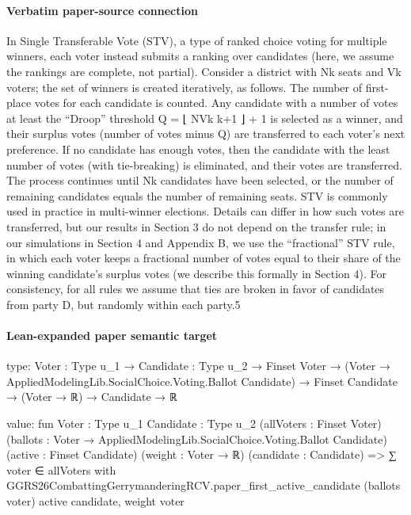 \documentclass[10pt]{article}
\begin{document}
\paragraph{Verbatim paper-source connection}
\begin{ReviewVerbatim}
In Single Transferable Vote (STV), a type of ranked choice voting for multiple winners, each
voter instead submits a ranking over candidates (here, we assume the rankings are complete, not
partial). Consider a district with Nk seats and Vk voters; the set of winners is created iteratively, as
follows. The number of first-place votes for each candidate is counted. Any candidate with a number
of votes at least the “Droop” threshold Q = ⌊ NVk k+1 ⌋ + 1 is selected as a winner, and their surplus
votes (number of votes minus Q) are transferred to each voter’s next preference. If no candidate has
enough votes, then the candidate with the least number of votes (with tie-breaking) is eliminated,
and their votes are transferred. The process continues until Nk candidates have been selected, or
the number of remaining candidates equals the number of remaining seats. STV is commonly used
in practice in multi-winner elections.
    Details can differ in how such votes are transferred, but our results in Section 3 do not depend
on the transfer rule; in our simulations in Section 4 and Appendix B, we use the “fractional” STV
rule, in which each voter keeps a fractional number of votes equal to their share of the winning
candidate’s surplus votes (we describe this formally in Section 4). For consistency, for all rules we
assume that ties are broken in favor of candidates from party D, but randomly within each party.5
\end{ReviewVerbatim}



\paragraph{Lean-expanded paper semantic target}
\begin{ReviewVerbatim}
type:
{Voter : Type u_1} →
  {Candidate : Type u_2} →
    Finset Voter →
      (Voter → AppliedModelingLib.SocialChoice.Voting.Ballot Candidate) → Finset Candidate → (Voter → ℝ) → Candidate → ℝ

value:
fun {Voter : Type u_1} {Candidate : Type u_2} (allVoters : Finset Voter)
    (ballots : Voter → AppliedModelingLib.SocialChoice.Voting.Ballot Candidate) (active : Finset Candidate)
    (weight : Voter → ℝ) (candidate : Candidate) =>
  ∑ voter ∈ allVoters with
    GGRS26CombattingGerrymanderingRCV.paper_first_active_candidate (ballots voter) active candidate, weight voter
\end{ReviewVerbatim}
\end{document}
